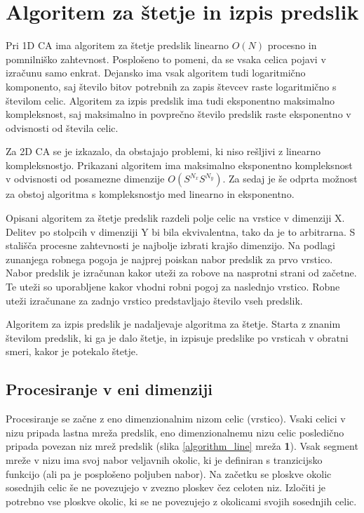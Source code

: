 \documentclass[12pt,a4paper,openany,twoside]{book}
\begin{document}
\chapter{Algoritem za štetje in izpis predslik}

Pri 1D CA ima algoritem za štetje predslik linearno \(O(N)\) procesno in pomnilniško zahtevnost.
Posplošeno to pomeni, da se vsaka celica pojavi v izračunu samo enkrat.
Dejansko ima vsak algoritem tudi logaritmično komponento,
saj število bitov potrebnih za zapis števcev raste logaritmično s številom celic.
Algoritem za izpis predslik ima tudi eksponentno maksimalno kompleksnost,
saj maksimalno in povprečno število predslik raste eksponentno
v odvisnosti od števila celic.

Za 2D CA se je izkazalo, da obstajajo problemi, ki niso rešljivi z linearno kompleksnostjo.
Prikazani algoritem ima maksimalno eksponentno kompleksnost
v odvisnosti od posamezne dimenzije \(O(S^{N_x} S^{N_y})\).
Za sedaj je še odprta možnost za obstoj algoritma s kompleksnostjo
med linearno in eksponentno.

Opisani algoritem za štetje predslik razdeli polje celic na vrstice v dimenziji X.
Delitev po stolpcih v dimenziji Y bi bila ekvivalentna,
tako da je to arbitrarna. S stališča procesne zahtevnosti je najbolje izbrati krajšo dimenzijo.
Na podlagi zunanjega robnega pogoja je najprej poiskan nabor predslik za prvo vrstico.
Nabor predslik je izračunan kakor uteži za robove na nasprotni strani od začetne.
Te uteži so uporabljene kakor vhodni robni pogoj za naslednjo vrstico.
Robne uteži izračunane za zadnjo vrstico predstavljajo število vseh predslik.

Algoritem za izpis predslik je nadaljevaje algoritma za štetje.
Starta z znanim številom predslik, ki ga je dalo štetje, in izpisuje predslike
po vrsticah v obratni smeri, kakor je potekalo štetje.

\section{Procesiranje v eni dimenziji}

Procesiranje se začne z eno dimenzionalnim nizom celic (vrstico).
Vsaki celici v nizu pripada lastna mreža predslik, eno dimenzionalnemu nizu celic
posledično pripada povezan niz mrež predslik (slika \ref{algorithm_line} mreža \textbf{1}).
Vsak segment mreže v nizu ima svoj nabor veljavnih okolic,
ki je definiran s tranzicijsko funkcijo (ali pa je posplošeno poljuben nabor).
Na začetku se ploskve okolic sosednjih celic še ne povezujejo v
zvezno ploskev čez celoten niz. Izločiti je potrebno vse ploskve okolic,
ki se ne povezujejo z okolicami svojih sosednjih celic.
\end{document}
